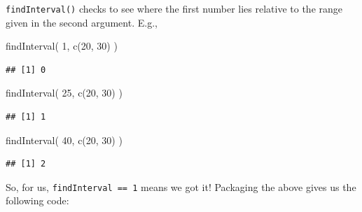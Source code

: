 \documentclass[
]{book}
\newenvironment{Shaded}{\begin{snugshade}}{\end{snugshade}}
\newcommand{\AttributeTok}[1]{\textcolor[rgb]{0.77,0.63,0.00}{#1}}
\newcommand{\CommentTok}[1]{\textcolor[rgb]{0.56,0.35,0.01}{\textit{#1}}}
\newcommand{\DecValTok}[1]{\textcolor[rgb]{0.00,0.00,0.81}{#1}}
\newcommand{\FunctionTok}[1]{\textcolor[rgb]{0.00,0.00,0.00}{#1}}
\newcommand{\NormalTok}[1]{#1}
\newcommand{\OtherTok}[1]{\textcolor[rgb]{0.56,0.35,0.01}{#1}}
\newcommand{\SpecialCharTok}[1]{\textcolor[rgb]{0.00,0.00,0.00}{#1}}
\begin{document}
\texttt{findInterval()} checks to see where the first number lies relative to the
range given in the second argument. E.g.,

\begin{Shaded}
\begin{Highlighting}[]
\FunctionTok{findInterval}\NormalTok{( }\DecValTok{1}\NormalTok{, }\FunctionTok{c}\NormalTok{(}\DecValTok{20}\NormalTok{, }\DecValTok{30}\NormalTok{) )}
\end{Highlighting}
\end{Shaded}

\begin{verbatim}
## [1] 0
\end{verbatim}

\begin{Shaded}
\begin{Highlighting}[]
\FunctionTok{findInterval}\NormalTok{( }\DecValTok{25}\NormalTok{, }\FunctionTok{c}\NormalTok{(}\DecValTok{20}\NormalTok{, }\DecValTok{30}\NormalTok{) )}
\end{Highlighting}
\end{Shaded}

\begin{verbatim}
## [1] 1
\end{verbatim}

\begin{Shaded}
\begin{Highlighting}[]
\FunctionTok{findInterval}\NormalTok{( }\DecValTok{40}\NormalTok{, }\FunctionTok{c}\NormalTok{(}\DecValTok{20}\NormalTok{, }\DecValTok{30}\NormalTok{) )}
\end{Highlighting}
\end{Shaded}

\begin{verbatim}
## [1] 2
\end{verbatim}

So, for us, \texttt{findInterval\ ==\ 1} means we got it! Packaging the above gives
us the following code:

\begin{Shaded}
\end{Shaded}
\end{document}
